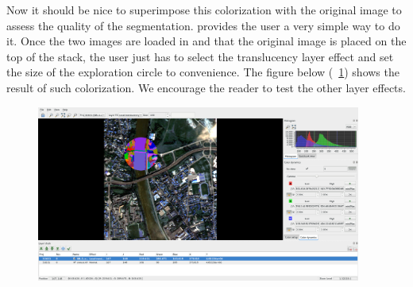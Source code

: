 Now it should be nice to superimpose this colorization with the original image to assess the quality of the segmentation.
\mont provides the user a very simple way to do it. Once the two images are loaded in \mont and that the original image is placed on the top of the stack, 
the user just has to select the translucency layer effect and set the size of the exploration circle to convenience.
The figure below (~\ref{fig:seg4}) shows the result of such colorization. We encourage the reader to test the other layer effects.

\begin{figure}[!h] 
  \center
  \includegraphics[width=0.95\textwidth]{../Art/MonteverdiImages/seg4.png}
  \label{fig:seg4}
\end{figure}

